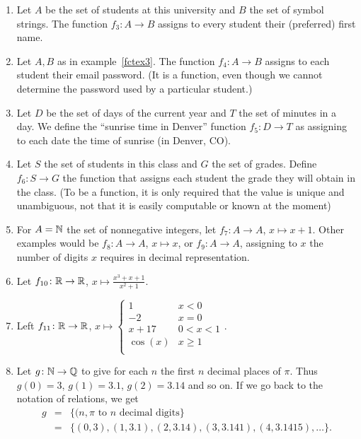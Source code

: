 \begin{enumerate}
\item Let $A$ be the set of students at this university and $B$ the set of
symbol strings. The function $f_3\colon A\to B$ assigns to every student their
(preferred) first name. \label{fctex3}
\item Let $A,B$ as in example~\ref{fctex3}.
The function $f_4\colon A\to B$ assigns to each student
their email password. (It is a function, even though we cannot determine the
password used by a particular student.)
\item Let $D$ be the set of days of the current year and $T$ the set of
minutes in a day. We define the ``sunrise time in Denver'' function $f_5\colon
D\to T$ as assigning to each date the time of sunrise (in Denver, CO).
\item Let $S$ the set of students in this class and $G$ the set of grades.
Define $f_6\colon S\to G$ the function that assigns each student the
grade they will obtain in the class.
(To be a function, it is only required that the value is unique and
unambiguous, not that it is easily computable or known at the moment)
\item For $A={\mathbb N}$ the set of nonnegative integers,
let $f_7\colon A\to A$, $x\mapsto x+1$. Other examples would be
$f_8\colon A\to A$, $x\mapsto x$, or
$f_9\colon A\to A$, assigning to $x$ the number of digits $x$ requires in
decimal representation.
\item Let $f_{10}\colon {\mathbb R}\to{\mathbb R}$, $x\mapsto\frac{x^3+x+1}{x^2+1}$.
\item Left $f_{11}\colon{\mathbb R}\to{\mathbb R}$, $x\mapsto\begin{cases}
1&x<0\\
-2&x=0\\
x+17&0<x<1\\
\cos(x)&x\ge 1\\
\end{cases}$.
\item Let $g\colon{\mathbb N}\to{\mathbb Q}$ to give for each $n$ the first $n$ decimal
places of $\pi$. Thus $g(0)=3$, $g(1)=3.1$, $g(2)=3.14$ and so on. If we go
back to the notation of relations, we get
\begin{eqnarray*}
g&=&\{(n,\mbox{$\pi$ to $n$ decimal digits}\}\\
&=&\{(0,3),(1,3.1),(2,3.14),(3,3.141),(4,3.1415),\ldots\}.
\end{eqnarray*}
\end{enumerate}


